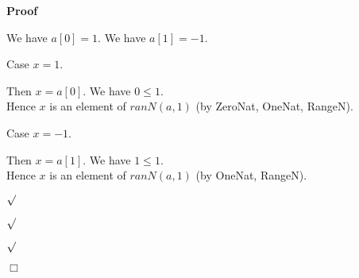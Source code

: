 \documentclass{article}
\newenvironment{forthel}{\begin{leftbar}}{\end{leftbar}}
\newenvironment{proof}{\noindent\textbf{Proof\ }}{\hspace*{\fill}$\Box$\medskip}
\newenvironment{subproof}{\begin{list}{}{}
		\item[\text{Proof}]}{\hfill $\surd$ \end{list}}
\newenvironment{case}{\begin{list}{}{}
		\item[]}{\end{list}}
\begin{document}
\begin{forthel}
\begin{proof}
\begin{subproof}
\begin{subproof}
\begin{subproof}
					We have $a[0] = 1$.
					We have $a[1] = -1$.
					
					Case $x = 1$.
					\begin{case}
						Then $x = a[0]$.
						We have $0 \leq 1$.\\
						Hence $x$ is an element of $ranN(a,1)$ (by ZeroNat, OneNat, RangeN).
					\end{case}
					Case $x = -1$.
					\begin{case}
						Then $x = a[1]$. 
						We have $1 \leq 1$.\\
						Hence $x$ is an element of $ranN(a,1)$ (by OneNat, RangeN).
					\end{case}
				\end{subproof}
			\end{subproof}
		\end{subproof}
	\end{proof}
\end{forthel}
\end{document}
